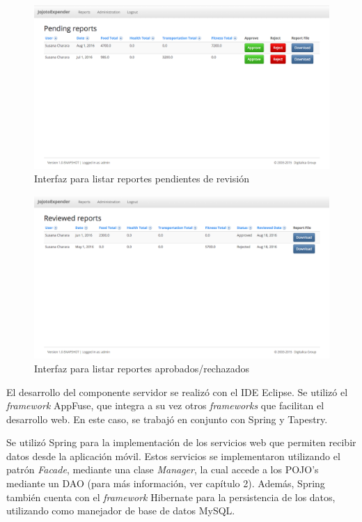 \begin{figure}[ht]
  \centering
  \includegraphics[scale=0.4,type=png,ext=.png,read=.png]{imagenes/pending_reports}
  \caption{Interfaz para listar reportes pendientes de revisión}
  \label{fig:interfazListarReportesPendientes}
\end{figure}

\begin{figure}[h]
  \centering
  \includegraphics[scale=0.4,type=png,ext=.png,read=.png]{imagenes/reviewed_reports}
  \caption{Interfaz para listar reportes aprobados/rechazados}
  \label{fig:interfazListarReportesRevisados}
\end{figure}

El desarrollo del componente servidor se realizó con el IDE Eclipse. Se utilizó el \textit{framework} AppFuse, que integra a su vez otros \textit{frameworks} que facilitan el desarrollo web. En este caso, se trabajó en conjunto con Spring y Tapestry.

Se utilizó Spring para la implementación de los servicios web que permiten recibir datos desde la aplicación móvil. Estos servicios se implementaron utilizando el patrón \textit{Facade}, mediante una clase \textit{Manager}, la cual accede a los POJO's mediante un DAO (para más información, ver capítulo 2). Además, Spring también cuenta con el \textit{framework} Hibernate para la persistencia de los datos, utilizando como manejador de base de datos MySQL.

